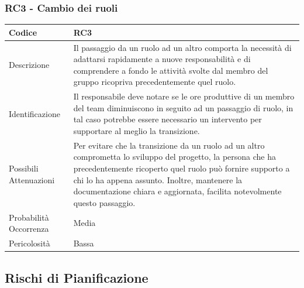 \documentclass[10pt]{article}
\begin{document}
{    \subsubsection{RC3 - Cambio dei ruoli}
    \label{RC3}
    \begin{tabularx}{\textwidth}{|l|X|}
    \hline
    Codice & RC3 \\
    \hline
    Descrizione &  Il passaggio da un ruolo ad un altro comporta la necessità di adattarsi rapidamente a nuove responsabilità e di comprendere a fondo le attività svolte dal membro del gruppo ricopriva precedentemente quel ruolo. \\
    \hline
    Identificazione & Il responsabile deve notare se le ore produttive di un membro del team diminuiscono in seguito ad un passaggio di ruolo, in tal caso potrebbe essere necessario un intervento per supportare al meglio la transizione.  \\
    \hline
    Possibili Attenuazioni &  Per evitare che la transizione da un ruolo ad un altro comprometta lo sviluppo del progetto, la persona che ha precedentemente ricoperto quel ruolo può fornire supporto a chi lo ha appena assunto. Inoltre, mantenere la documentazione chiara e aggiornata, facilita notevolmente questo passaggio. \\
    \hline
    Probabilità Occorrenza &  Media \\
    \hline
    Pericolosità & Bassa \\ 
    \hline
    \end{tabularx}
    
    
\subsection{Rischi di Pianificazione}
}
\end{document}
